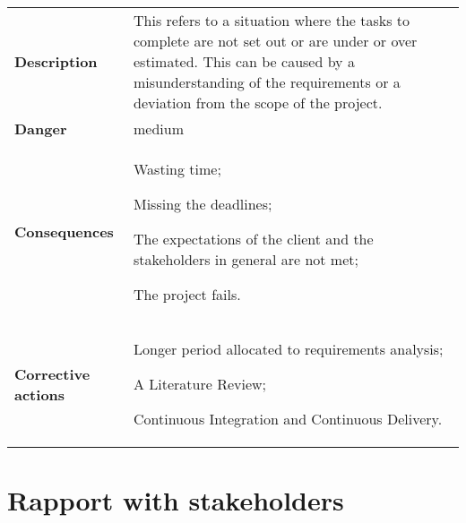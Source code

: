 \renewcommand*{\arraystretch}{1.6}
\begin{longtable}{ l | p{11cm}}
	\hline
	\rowcolor{Gray}
	\multicolumn{2}{c}{Poor planning} \\
	\hline
	\textbf{Description} & This refers to a situation where the tasks to complete are not set out or are under or over estimated. This can be caused by a misunderstanding of the requirements or a deviation from the scope of the project. \\
	\textbf{Danger} & medium \\
	\textbf{Consequences} & \begin{enumerate*}[label=(\arabic*.), itemjoin={\newline}]
		\item Wasting time;
		\item Missing the deadlines;
		\item The expectations of the client and the stakeholders in general are not met;
		\item The project fails.
	\end{enumerate*}\\
	\textbf{Corrective actions} & \begin{enumerate*}[label=(\arabic*.), itemjoin={\newline}]
		\item Longer period allocated to requirements analysis;
		\item A Literature Review;
		\item Continuous Integration and Continuous Delivery.
	\end{enumerate*} \\
\end{longtable}


\section{Rapport with stakeholders}

